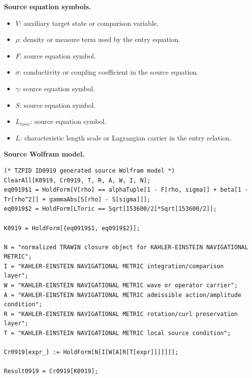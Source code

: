 \begin{minipage}[t]{0.49\linewidth}
\begingroup
\small
\raggedright
\textbf{Source equation symbols.}\par
\begin{itemize}[leftmargin=1.35em,itemsep=1pt,topsep=1pt,parsep=0pt]
    \item $V$: auxiliary target state or comparison variable.
    \item $\rho$: density or measure term used by the entry equation.
    \item $F$: source equation symbol.
    \item $\sigma$: conductivity or coupling coefficient in the source equation.
    \item $\gamma$: source equation symbol.
    \item $S$: source equation symbol.
    \item $L_{toric}$: source equation symbol.
    \item $L$: characteristic length scale or Lagrangian carrier in the entry relation.
\end{itemize}
\endgroup
\end{minipage}\hfill
\begin{minipage}[t]{0.47\linewidth}
\begingroup
\scriptsize
\raggedright
\textbf{Source Wolfram model.}\par
\begin{Verbatim}[fontsize=\tiny,breaklines=true,breakanywhere=true]
(* TZPID ID0919 generated source Wolfram model *)
ClearAll[K0919, Cr0919, T, R, A, W, I, N];
eq0919$1 = HoldForm[V[rho] == alphaTuple[1 - F[rho, sigma]] + beta[1 - Tr[rho^2]] + gammaAbs[S[rho] - S[sigma]]];
eq0919$2 = HoldForm[LToric == Sqrt[153600/2]*Sqrt[153600/2]];

K0919 = HoldForm[{eq0919$1, eq0919$2}];

N = "normalized TRAWIN closure object for KAHLER-EINSTEIN NAVIGATIONAL METRIC";
I = "KAHLER-EINSTEIN NAVIGATIONAL METRIC integration/comparison layer";
W = "KAHLER-EINSTEIN NAVIGATIONAL METRIC wave or operator carrier";
A = "KAHLER-EINSTEIN NAVIGATIONAL METRIC admissible action/amplitude condition";
R = "KAHLER-EINSTEIN NAVIGATIONAL METRIC rotation/curl preservation layer";
T = "KAHLER-EINSTEIN NAVIGATIONAL METRIC local source condition";

Cr0919[expr_] := HoldForm[N[I[W[A[R[T[expr]]]]]]];

Result0919 = Cr0919[K0919];
\end{Verbatim}
\endgroup
\end{minipage}

